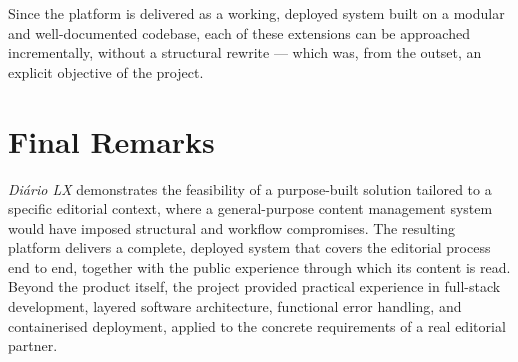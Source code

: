 Since the platform is delivered as a working, deployed system built on a modular and
well-documented codebase, each of these extensions can be approached incrementally,
without a structural rewrite --- which was, from the outset, an explicit objective of the
project.

\section{Final Remarks} \label{sec:conc_remarks}

\textit{Diário LX} demonstrates the feasibility of a purpose-built solution tailored to a
specific editorial context, where a general-purpose content management system would have
imposed structural and workflow compromises. The resulting platform delivers a complete,
deployed system that covers the editorial process end to end, together with the public
experience through which its content is read. Beyond the product itself, the project
provided practical experience in full-stack development, layered software architecture,
functional error handling, and containerised deployment, applied to the concrete
requirements of a real editorial partner.
